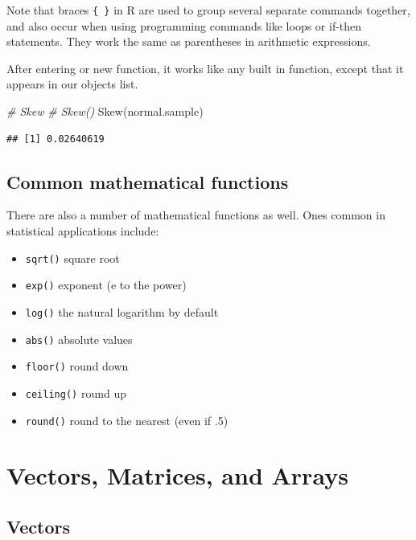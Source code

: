 \documentclass[
]{book}
\newenvironment{Shaded}{\begin{snugshade}}{\end{snugshade}}
\newcommand{\CommentTok}[1]{\textcolor[rgb]{0.56,0.35,0.01}{\textit{#1}}}
\newcommand{\FunctionTok}[1]{\textcolor[rgb]{0.00,0.00,0.00}{#1}}
\newcommand{\NormalTok}[1]{#1}
\providecommand{\tightlist}{%
  \setlength{\itemsep}{0pt}\setlength{\parskip}{0pt}}
\begin{document}
Note that braces \texttt{\{\ \}} in R are used to group several separate commands together, and also occur when using programming commands like loops or if-then statements. They work the same as parentheses in arithmetic expressions.

After entering or new function, it works like any built in function, except that it appears in our objects list.

\begin{Shaded}
\begin{Highlighting}[]
\CommentTok{\# Skew}
\CommentTok{\# Skew()}
\FunctionTok{Skew}\NormalTok{(normal.sample)}
\end{Highlighting}
\end{Shaded}

\begin{verbatim}
## [1] 0.02640619
\end{verbatim}

\hypertarget{common-mathematical-functions}{%
\subsection*{Common mathematical functions}\label{common-mathematical-functions}}

There are also a number of mathematical functions as well. Ones common in statistical applications include:

\begin{itemize}
\tightlist
\item
  \texttt{sqrt()} square root
\item
  \texttt{exp()} exponent (e to the power)
\item
  \texttt{log()} the natural logarithm by default
\item
  \texttt{abs()} absolute values
\item
  \texttt{floor()} round down
\item
  \texttt{ceiling()} round up
\item
  \texttt{round()} round to the nearest (even if .5)
\end{itemize}

\hypertarget{vectors-matrices-and-arrays}{%
\section{Vectors, Matrices, and Arrays}\label{vectors-matrices-and-arrays}}

\hypertarget{vectors}{%
\subsection*{Vectors}\label{vectors}}
\end{document}
